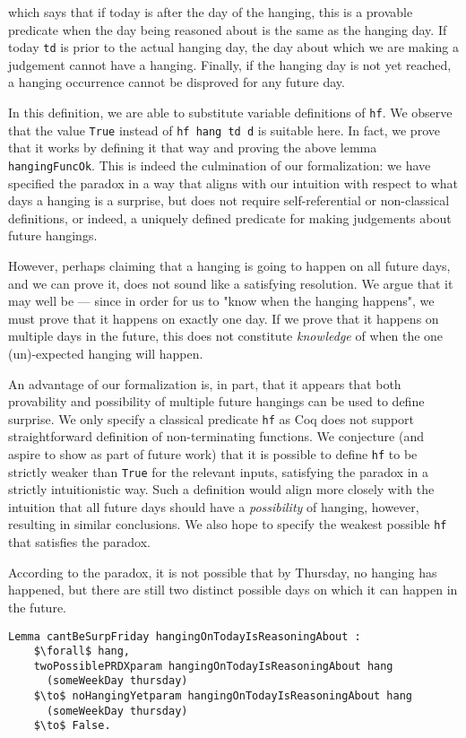 \documentclass[runningheads]{llncs}
\begin{document}
which says that if today is after the day of the hanging, this is a provable predicate when the
day being reasoned about is the same as the hanging day. If today {\tt td} is prior
to the actual hanging day, the day about which we are making a judgement
cannot have a hanging. Finally, if the hanging day is not
yet reached, a hanging occurrence cannot be disproved for any future day.

In this definition, we are able to substitute variable definitions of {\tt hf}.
We observe that the value {\tt True} instead of {\tt hf hang td d} is suitable
here. In fact, we prove that it works by defining it that
way and proving the above lemma {\tt hangingFuncOk}. This is indeed the culmination of
our formalization: we have specified the paradox in a way that aligns with our
intuition with respect to what days a hanging is a surprise, but does not require
self-referential or non-classical definitions, or indeed, a uniquely
defined predicate for making judgements about future hangings.

However, perhaps claiming that a hanging is going to happen
on all future days, and we can prove it, does not sound like a satisfying
resolution. We argue that it may well be --- since in order for us to
"know when the hanging happens", we must prove that it happens on exactly one day.
If we prove that it happens on multiple days in the future, this does not
constitute \emph{knowledge} of when the one (un)-expected hanging will happen.

An advantage of our formalization is, in part, that it appears that both
provability and possibility of multiple future hangings can be used to define surprise.
We only specify a classical predicate {\tt hf} as Coq does not support
straightforward definition of non-terminating functions.
We conjecture (and aspire to show as part of future work) that it is possible to
define {\tt hf} to be strictly weaker than {\tt True} for the relevant inputs,
satisfying the paradox in a strictly intuitionistic way. Such a definition would align more closely with
the intuition that all future days should have a \emph{possibility} of hanging, however,
resulting in similar conclusions.
We also hope to specify the weakest possible {\tt hf} that satisfies the paradox.

According to the paradox, it is not possible that by Thursday,
no hanging has happened, but there are still two distinct possible days on which it can
happen in the future.

\begin{lstlisting}[mathescape=true]
  Lemma cantBeSurpFriday hangingOnTodayIsReasoningAbout :
    $\forall$ hang,
    twoPossiblePRDXparam hangingOnTodayIsReasoningAbout hang
      (someWeekDay thursday)
    $\to$ noHangingYetparam hangingOnTodayIsReasoningAbout hang
      (someWeekDay thursday)
    $\to$ False.
\end{lstlisting}
\end{document}
